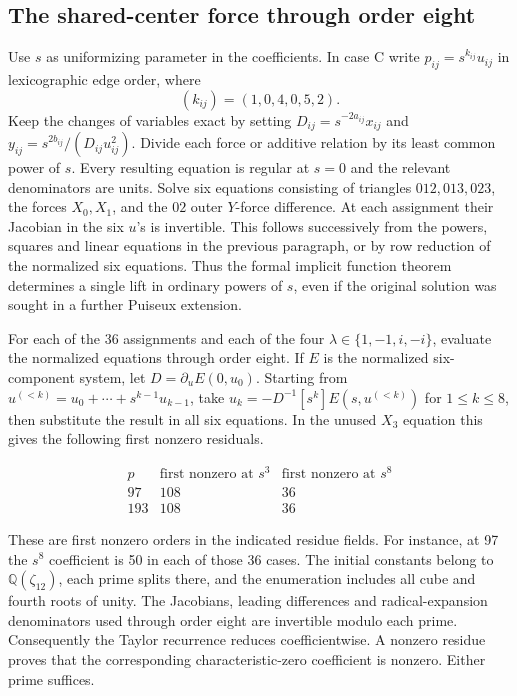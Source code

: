 \documentclass[11pt,letterpaper]{article}
\theoremstyle{definition}
\begin{document}
\subsection{The shared-center force through order eight}

Use $s$ as uniformizing parameter in the coefficients. In case C write $p_{ij}=s^{k_{ij}}u_{ij}$ in lexicographic edge order, where
\[
(k_{ij})=(1,0,4,0,5,2).
\]
Keep the changes of variables exact by setting $D_{ij}=s^{-2a_{ij}}x_{ij}$ and $y_{ij}=s^{2b_{ij}}/(D_{ij}u_{ij}^2)$. Divide each force or additive relation by its least common power of $s$. Every resulting equation is regular at $s=0$ and the relevant denominators are units. Solve six equations consisting of triangles $012,013,023$, the forces $X_0,X_1$, and the $02$ outer $Y$-force difference. At each assignment their Jacobian in the six $u$'s is invertible. This follows successively from the powers, squares and linear equations in the previous paragraph, or by row reduction of the normalized six equations. Thus the formal implicit function theorem determines a single lift in ordinary powers of $s$, even if the original solution was sought in a further Puiseux extension.

For each of the 36 assignments and each of the four $\lambda\in\{1,-1,i,-i\}$, evaluate the normalized equations through order eight. If $E$ is the normalized six-component system, let $D=\partial_u E(0,u_0)$.
Starting from $u^{(<k)}=u_0+\cdots +s^{k-1}u_{k-1}$, take
$u_k=-D^{-1}[s^k]E(s,u^{(<k)})$ for $1\le k\le8$, then substitute the
result in all six equations. In the unused $X_3$ equation this gives the following first nonzero residuals.

\[
\begin{array}{c|rr}
 p&\text{first nonzero at }s^3&\text{first nonzero at }s^8\\ \hline
 97&108&36\\ 193&108&36
\end{array}
\]

These are first nonzero orders in the indicated residue fields. For instance, at 97 the $s^8$ coefficient is 50 in each of those 36 cases. The initial constants belong to $\mathbb Q(\zeta_{12})$, each prime splits there, and the enumeration includes all cube and fourth roots of unity. The Jacobians, leading differences and radical-expansion denominators used through order eight are invertible modulo each prime. Consequently the Taylor recurrence reduces coefficientwise. A nonzero residue proves that the corresponding characteristic-zero coefficient is nonzero. Either prime suffices.
\end{document}
